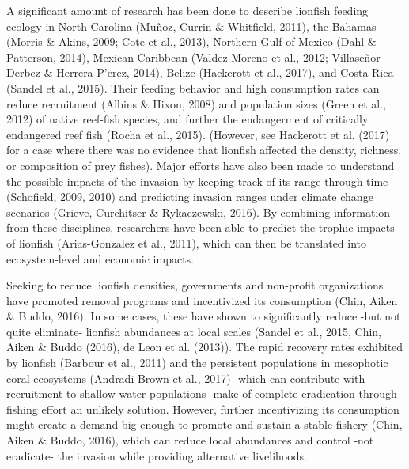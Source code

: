 \documentclass[12pt,]{article}
\begin{document}
A significant amount of research has been done to describe lionfish
feeding ecology in North Carolina (Muñoz, Currin \& Whitfield, 2011),
the Bahamas (Morris \& Akins, 2009; Cote et al., 2013), Northern Gulf of
Mexico (Dahl \& Patterson, 2014), Mexican Caribbean (Valdez-Moreno et
al., 2012; Villaseñor-Derbez \& Herrera-P\a'erez, 2014), Belize
(Hackerott et al., 2017), and Costa Rica (Sandel et al., 2015). Their
feeding behavior and high consumption rates can reduce recruitment
(Albins \& Hixon, 2008) and population sizes (Green et al., 2012) of
native reef-fish species, and further the endangerment of critically
endangered reef fish (Rocha et al., 2015). (However, see Hackerott et
al. (2017) for a case where there was no evidence that lionfish affected
the density, richness, or composition of prey fishes). Major efforts
have also been made to understand the possible impacts of the invasion
by keeping track of its range through time (Schofield, 2009, 2010) and
predicting invasion ranges under climate change scenarios (Grieve,
Curchitser \& Rykaczewski, 2016). By combining information from these
disciplines, researchers have been able to predict the trophic impacts
of lionfish (Arias-Gonzalez et al., 2011), which can then be translated
into ecosystem-level and economic impacts.

Seeking to reduce lionfish densities, governments and non-profit
organizations have promoted removal programs and incentivized its
consumption (Chin, Aiken \& Buddo, 2016). In some cases, these have
shown to significantly reduce -but not quite eliminate- lionfish
abundances at local scales (Sandel et al., 2015, Chin, Aiken \& Buddo
(2016), de Leon et al. (2013)). The rapid recovery rates exhibited by
lionfish (Barbour et al., 2011) and the persistent populations in
mesophotic coral ecosystems (Andradi-Brown et al., 2017) -which can
contribute with recruitment to shallow-water populations- make of
complete eradication through fishing effort an unlikely solution.
However, further incentivizing its consumption might create a demand big
enough to promote and sustain a stable fishery (Chin, Aiken \& Buddo,
2016), which can reduce local abundances and control -not eradicate- the
invasion while providing alternative livelihoods.
\end{document}
